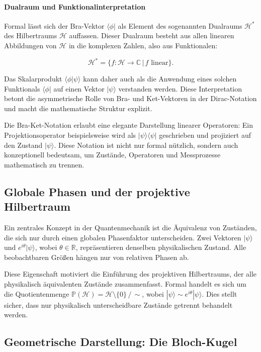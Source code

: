\paragraph{Dualraum und Funktionalinterpretation}

Formal lässt sich der Bra-Vektor $\langle \phi|$ als Element des sogenannten Dualraums $\mathcal{H}^*$ des Hilbertraums $\mathcal{H}$ auffassen. Dieser Dualraum besteht aus allen linearen Abbildungen von $\mathcal{H}$ in die komplexen Zahlen, also aus Funktionalen:

\[
\mathcal{H}^* = \{ f : \mathcal{H} \to \mathbb{C} \,|\, f \text{ linear} \}.
\]

Das Skalarprodukt $\langle \phi | \psi \rangle$ kann daher auch als die Anwendung eines solchen Funktionals $\langle \phi|$ auf einen Vektor $|\psi\rangle$ verstanden werden. Diese Interpretation betont die asymmetrische Rolle von Bra- und Ket-Vektoren in der Dirac-Notation und macht die mathematische Struktur explizit.

Die Bra-Ket-Notation erlaubt eine elegante Darstellung linearer Operatoren: Ein Projektionsoperator beispielsweise wird als $|\psi\rangle\langle\psi|$ geschrieben und projiziert auf den Zustand $|\psi\rangle$. Diese Notation ist nicht nur formal nützlich, sondern auch konzeptionell bedeutsam, um Zustände, Operatoren und Messprozesse mathematisch zu trennen.

\subsection{Globale Phasen und der projektive Hilbertraum}
\label{subsec:Globale Phasen und der projektive Hilbertraum }

Ein zentrales Konzept in der Quantenmechanik ist die Äquivalenz von Zuständen, die sich nur durch einen globalen Phasenfaktor unterscheiden. Zwei Vektoren $|\psi\rangle$ und $e^{i\theta} |\psi\rangle$, wobei $\theta \in \mathbb{R}$, repräsentieren denselben physikalischen Zustand. Alle beobachtbaren Größen hängen nur von relativen Phasen ab.

Diese Eigenschaft motiviert die Einführung des projektiven Hilbertraums, der alle physikalisch äquivalenten Zustände zusammenfasst. Formal handelt es sich um die Quotientenmenge $\mathbb{P}(\mathcal{H}) = \mathcal{H} \setminus \{0\} \,/\, \sim$, wobei $|\psi\rangle \sim e^{i\theta}|\psi\rangle$. Dies stellt sicher, dass nur physikalisch unterscheidbare Zustände getrennt behandelt werden.

\subsection{Geometrische Darstellung: Die Bloch-Kugel}
\label{subsec:Geometrische Darstellung: Die Bloch-Kugel }


